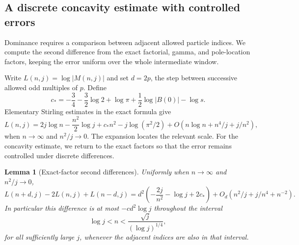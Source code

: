 \documentclass[11pt]{article}
\numberwithin{equation}{section}
\newtheorem{lemma}[theorem]{Lemma}
\theoremstyle{definition}
\begin{document}
\subsection{A discrete concavity estimate with controlled errors}

Dominance requires a comparison between adjacent allowed particle
indices. We compute the second difference from the exact factorial,
gamma, and pole-location factors, keeping the error uniform over the
whole intermediate window.

Write $L(n,j)=\log|M(n,j)|$ and set $d=2p$, the step between
successive allowed odd multiples of $p$. Define
\begin{equation}\label{eq:jets_c0}
 c_*=-\frac34-\frac32\log2+\log\pi
       +\frac12\log|B(0)|-\log s.
\end{equation}
Elementary Stirling estimates in the exact formula give
\begin{equation}\label{eq:jets_L_expansion}
 L(n,j)=2j\log n-\frac{n^2}2\log j+c_*n^2
       -j\log(\pi^2/2)
       +O(n\log n+n^4/j+j/n^2),
\end{equation}
when $n\to\infty$ and $n^2/j\to0$.
The expansion locates the relevant scale. For the concavity estimate,
we return to the exact factors so that the error remains controlled
under discrete differences.

\begin{lemma}[Exact-factor second differences]
\label{lem:jets_discrete_concavity}
Uniformly when $n\to\infty$ and $n^2/j\to0$,
\begin{equation}\label{eq:jets_second_difference}
 L(n+d,j)-2L(n,j)+L(n-d,j)
 =d^2\left(-\frac{2j}{n^2}-\log j+2c_*\right)
  +O_d(n^2/j+j/n^4+n^{-2}).
\end{equation}
In particular this difference is at most $-c d^2\log j$ throughout
the interval
\begin{equation}\label{eq:jets_middle_window}
 \log j<n<\frac{\sqrt j}{(\log j)^{1/4}},
\end{equation}
for all sufficiently large $j$, whenever the adjacent indices are
also in that interval.
\end{lemma}
\end{document}
